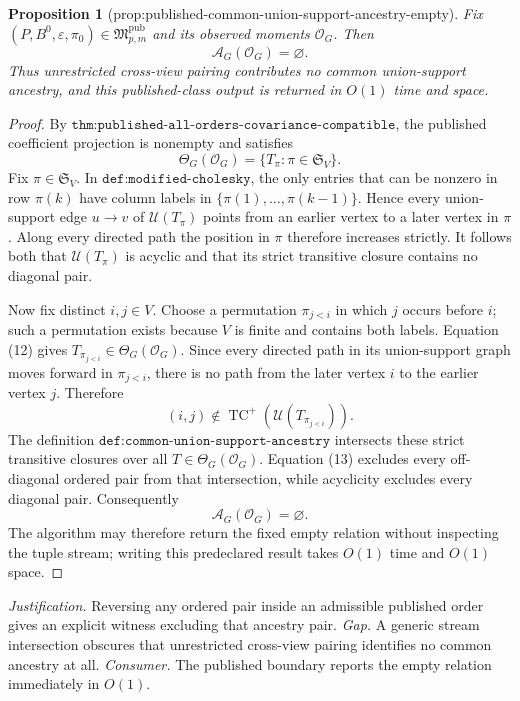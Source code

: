 \documentclass{article}
\newtheorem{proposition}{Proposition}
\begin{document}
\begin{proposition}[prop:published-common-union-support-ancestry-empty]\label{prop:published-common-union-support-ancestry-empty}
Fix \((P,B^0,\varepsilon,\pi_0)\in\mathfrak M_{p,m}^{\mathrm{pub}}\) and its observed moments \(\mathcal O_G\).  Then
\[
 \mathcal A_G(\mathcal O_G)=\varnothing.
\]
Thus unrestricted cross-view pairing contributes no common union-support ancestry, and this published-class output is returned in \(O(1)\) time and space.
\end{proposition}
\begin{proof}
By \(\texttt{thm:published-all-orders-covariance-compatible}\), the published coefficient projection is nonempty and satisfies
\[
 \Theta_G(\mathcal O_G)=\{T_\pi:\pi\in\mathfrak S_V\}.
\tag{12}
\]
Fix \(\pi\in\mathfrak S_V\).  In \(\texttt{def:modified-cholesky}\), the only entries that can be nonzero in row \(\pi(k)\) have column labels in \(\{\pi(1),\ldots,\pi(k-1)\}\).  Hence every union-support edge \(u\to v\) of \(\mathcal U(T_\pi)\) points from an earlier vertex to a later vertex in \(\pi\).  Along every directed path the position in \(\pi\) therefore increases strictly.  It follows both that \(\mathcal U(T_\pi)\) is acyclic and that its strict transitive closure contains no diagonal pair.

Now fix distinct \(i,j\in V\).  Choose a permutation \(\pi_{j<i}\) in which \(j\) occurs before \(i\); such a permutation exists because \(V\) is finite and contains both labels.  Equation (12) gives \(T_{\pi_{j<i}}\in\Theta_G(\mathcal O_G)\).  Since every directed path in its union-support graph moves forward in \(\pi_{j<i}\), there is no path from the later vertex \(i\) to the earlier vertex \(j\).  Therefore
\[
 (i,j)\notin
 \operatorname{TC}^{+}(\mathcal U(T_{\pi_{j<i}})).
\tag{13}
\]
The definition \(\texttt{def:common-union-support-ancestry}\) intersects these strict transitive closures over all \(T\in\Theta_G(\mathcal O_G)\).  Equation (13) excludes every off-diagonal ordered pair from that intersection, while acyclicity excludes every diagonal pair.  Consequently
\[
 \mathcal A_G(\mathcal O_G)=\varnothing.
\]
The algorithm may therefore return the fixed empty relation without inspecting the tuple stream; writing this predeclared result takes \(O(1)\) time and \(O(1)\) space.
\end{proof}
\par\smallskip\noindent \textit{Justification.} Reversing any ordered pair inside an admissible published order gives an explicit witness excluding that ancestry pair. \textit{Gap.} A generic stream intersection obscures that unrestricted cross-view pairing identifies no common ancestry at all. \textit{Consumer.} The published boundary reports the empty relation immediately in \(O(1)\).
\end{document}
